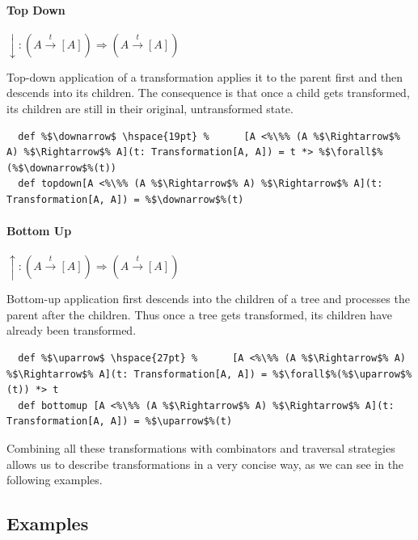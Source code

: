 \documentclass[10pt,a4paper,oneside]{scrreprt}
\begin{document}
\paragraph{Top Down} \hfill $\downarrow: (A \overset{t}{\rightarrow} [A]) \Rightarrow (A \overset{t}{\rightarrow} [A])$

\vspace{7pt} Top-down application of a transformation applies it to the parent first and then descends into its children. The consequence is that once a child gets transformed, its children are still in their original, untransformed state.

\begin{lstlisting}
  def %$\downarrow$ \hspace{19pt} %      [A <%\%% (A %$\Rightarrow$% A) %$\Rightarrow$% A](t: Transformation[A, A]) = t *> %$\forall$%(%$\downarrow$%(t))
  def topdown[A <%\%% (A %$\Rightarrow$% A) %$\Rightarrow$% A](t: Transformation[A, A]) = %$\downarrow$%(t)
\end{lstlisting}

\paragraph{Bottom Up} \hfill $\uparrow: (A \overset{t}{\rightarrow} [A]) \Rightarrow (A \overset{t}{\rightarrow} [A])$

\vspace{7pt} Bottom-up application first descends into the children of a tree and processes the parent after the children. Thus once a tree gets transformed, its children have already been transformed.

\begin{lstlisting}
  def %$\uparrow$ \hspace{27pt} %      [A <%\%% (A %$\Rightarrow$% A) %$\Rightarrow$% A](t: Transformation[A, A]) = %$\forall$%(%$\uparrow$%(t)) *> t
  def bottomup [A <%\%% (A %$\Rightarrow$% A) %$\Rightarrow$% A](t: Transformation[A, A]) = %$\uparrow$%(t)
\end{lstlisting}

Combining all these transformations with combinators and traversal strategies allows us to describe transformations in a very concise way, as we can see in the following examples.

\subsection{Examples}
\end{document}
